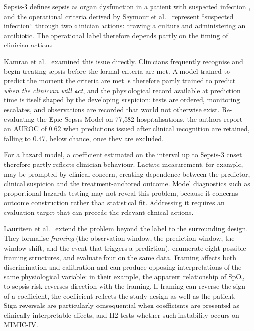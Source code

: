 Sepsis-3 defines sepsis as organ dysfunction in a patient with suspected
infection \cite{singer2016sepsis3}, and the operational criteria derived by
Seymour et al.\ \cite{seymour2016assessment} represent ``suspected infection''
through two clinician actions: drawing a culture and administering an
antibiotic. The operational label therefore depends partly on the timing of
clinician actions.

Kamran et al.\ \cite{kamran2024evaluation} examined this issue directly.
Clinicians frequently recognise and begin treating sepsis before the formal
criteria are met. A model trained to predict the moment the criteria are met is
therefore partly trained to predict \emph{when the clinician will act}, and the
physiological record available at prediction time is itself shaped by the
developing suspicion: tests are ordered, monitoring escalates, and observations
are recorded that would not otherwise exist. Re-evaluating the Epic Sepsis
Model on 77,582 hospitalisations, the authors report an AUROC of 0.62 when
predictions issued after clinical recognition are retained, falling to 0.47,
below chance, once they are excluded.

For a hazard model, a coefficient estimated on the interval up to Sepsis-3
onset therefore partly reflects clinician behaviour. Lactate measurement, for
example, may be prompted by clinical concern, creating dependence between the
predictor, clinical suspicion and the treatment-anchored outcome. Model
diagnostics such as proportional-hazards testing may not reveal this problem,
because it concerns outcome construction rather than statistical fit.
Addressing it requires an evaluation target that can precede the relevant
clinical actions.

Lauritsen et al.\ \cite{lauritsen2021framing} extend the problem beyond the
label to the surrounding design. They formalise \emph{framing} (the
observation window, the prediction window, the window shift, and the event that
triggers a prediction), enumerate eight possible framing structures, and
evaluate four on the same data. Framing affects both discrimination and
calibration and can produce opposing interpretations of the same physiological
variable: in their example, the apparent relationship of SpO$_2$ to sepsis
risk reverses direction with the framing. If framing can reverse the sign of a
coefficient, the coefficient reflects the study design as well as the patient.
Sign reversals are particularly consequential when coefficients are presented
as clinically interpretable effects, and H2 tests whether such instability
occurs on MIMIC-IV.

